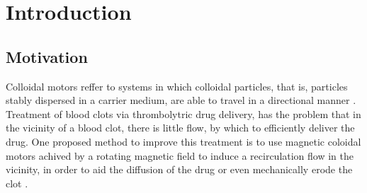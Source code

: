 \documentclass[12pt, DIV=12]{scrartcl}
\begin{document}

\newpage
\thispagestyle{empty}
\begin{abstract}
    \Large{\textbf{Abstract:}}

    \vspace{0.5cm}
    \normalsize
    This report presents work done in the 260035 LP Laboratory: Computational Statistical Mechanics, towards a larger project on recreating, in simulation, the experimental findings on field induced recirculation flows in a dilute magnetic colloid by Queiros Campos et al (2024) \cite{QueirosCampos2024}.

    The report discribes two different methods of creating densly packed raspberry ellipsoid particles, as well as a qualitative analysis of the magnetic behaviour obtained by applying the Thermal Stoner-Wohlfarth model by Mostarac (2025) \cite{Mostarac2025} to them.

    It is shown that the applied methods suitably reproduce the theoretical initial magnetization curve expected for a non-interacting solid and that the influence of several of the ellipsoids' parameters, qualitatively matches the expected effects on their hystereses.
\end{abstract}

\newpage
{}
\tableofcontents	%

\newpage
\pagestyle{scrheadings}

\section{Introduction}

\subsection{Motivation}

Colloidal motors reffer to systems in which colloidal particles, that is, particles stably dispersed in a carrier medium, are able to travel in a directional manner \cite{Chen2019}.\\
Treatment of blood clots via thrombolytric drug delivery, has the problem that in the vicinity of a blood clot, there is little flow, by which to efficiently deliver the drug. One proposed method to improve this treatment is to use magnetic coloidal motors achived by a rotating magnetic field to induce a recirculation flow in the vicinity, in order to aid the diffusion of the drug or even mechanically erode the clot \cite{Cheng2014}.
\end{document}
